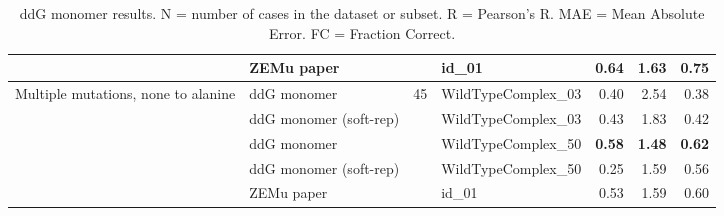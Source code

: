 \begin{table}
\begin{tabular}{llrlrrr}
 & ZEMu paper & & id\_01 & \textbf{0.64} & 1.63 & 0.75  \\
\hline
 \multirow{ 5}{*}{Multiple mutations, none to alanine} & ddG monomer & \multirow{ 5}{*}{45} & WildTypeComplex\_03 & 0.40 & 2.54 & 0.38  \\
 & ddG monomer (soft-rep) & & WildTypeComplex\_03 & 0.43 & 1.83 & 0.42  \\
 & ddG monomer & & WildTypeComplex\_50 & \textbf{0.58} & \textbf{1.48} & \textbf{0.62}  \\
 & ddG monomer (soft-rep) & & WildTypeComplex\_50 & 0.25 & 1.59 & 0.56  \\
 & ZEMu paper & & id\_01 & 0.53 & 1.59 & 0.60  \\
\bottomrule
\end{tabular}
  \caption[ddG monomer results]{
    ddG monomer results. N = number of cases in the dataset or subset. R = Pearson's R. MAE = Mean Absolute Error. FC = Fraction Correct.
  } \label{tab:table-ddG-monomer}
\end{table}
